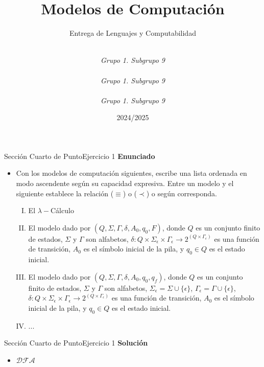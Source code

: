 \documentclass[10pt, envcountsect, presentation, aspectratio=169]{beamer}
\title[Nombre]{Modelos de Computación}
\subtitle{Entrega de Lenguajes y Computabilidad} %
\author[Carrillo G., Gallego J., Ibarrola Y.] %
{
	\sc{Ginés Carrillo Ibáñez}\\  %
	\textit{Grupo 1. Subgrupo 9}\\
	\sc{Juan Diego Gallego Nicolás}\\ %
	\textit{Grupo 1. Subgrupo 9}\\ 
	\sc{Yago Ibarrola Lapeña}\\ %
	\textit{Grupo 1. Subgrupo 9}\\ 
}
\institute[GII]%
{
	\textit{Universidad de Murcia}
}
\date{2024/2025} %
\begin{document}
	



\begin{frame}[plain]
	\titlepage
\end{frame}


\begin{frame}{Sección Cuarto de Punto}{Ejercicio 1}
    \textbf{Enunciado}
    \begin{itemize}
        \item Con los modelos de computación  siguientes,  escribe una lista  ordenada en modo ascendente según su capacidad expresiva. Entre un modelo y el siguiente establece  la relación  ($\equiv$) o ($\prec$) o  según corresponda.
		\begin{enumerate}[I)]
            \item El $\lambda-$Cálculo
            \item El modelo dado por $(Q,\Sigma,\Gamma,\delta,A_0,q_0,F)$, donde  $Q$ es un conjunto finito de estados, $\Sigma$ y $\Gamma$ son alfabetos, $\delta:Q\times \Sigma_\epsilon\times\Gamma_\epsilon\rightarrow 2^{(Q\times\Gamma_\epsilon)}$ es  una función de transición, $A_0$ es el símbolo inicial de la pila, y $q_0\in Q$ es el estado inicial. 
            \item El modelo dado por $(Q,\Sigma,\Gamma,\delta,A_0,q_0,q_f)$, donde  $Q$ es un conjunto finito de estados, $\Sigma$ y $\Gamma$ son alfabetos, $\Sigma_\epsilon=\Sigma \cup \{\epsilon\}$, $\Gamma_\epsilon=\Gamma \cup \{\epsilon\}$, $\delta:Q\times \Sigma_\epsilon\times\Gamma_\epsilon\rightarrow 2^{(Q\times\Gamma_\epsilon)}$ es  una  función de transición, $A_0$ es el símbolo inicial de la pila, y $q_0\in Q$ es el estado inicial. 
            \item ...
        \end{enumerate}
	\end{itemize}
\end{frame}


\begin{frame}{Sección Cuarto de Punto}{Ejercicio 1}
    \textbf{Solución}\\
    \begin{itemize}
        \item $\mathcal{DFA}$
    \end{itemize}
\end{frame}
\end{document}
